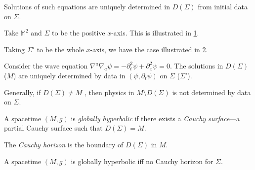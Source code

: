 Solutions of such equations are uniquely determined in $D(\Sigma)$  from initial data on $\Sigma$.
 \begin{example}[]
   Take $\mathbb{M}^2$  and $\Sigma$  to be the positive $x$-axis. This is illustrated in \ref{fig:l6f5}.
   \begin{figure}[tbhp]
     \centering
     \def\svgwidth{0.4\columnwidth}
     
     \caption{}
     \label{fig:l6f5}
   \end{figure}
   \begin{figure}[tbhp]
     \centering
     \def\svgwidth{0.4\columnwidth}
     
     \caption{}
     \label{fig:l6f6}
   \end{figure}
   Taking $\Sigma'$ to be the whole $x$-axis, we have the case illustrated in \ref{fig:l6f6}.

  Consider the wave equation $\nabla^{a} \nabla_{a} \psi = -\partial_t^2 \psi + \partial_x^2 \psi = 0$.
  The solutions in $D(\Sigma)$ ($M$) are uniquely determined by data in $(\psi, \partial_t \psi)$ on $\Sigma$ ($\Sigma'$).
\end{example}

Generally, if $D(\Sigma) \neq M$ , then physics in $M \setminus D(\Sigma)$  is not determined by data on $\Sigma$.

 \begin{definition}[]
   A spacetime $(M, g)$ is \emph{globally hyperbolic} if there exists a \emph{Cauchy surface}---a partial Cauchy surface such that $D(\Sigma) = M$.
\end{definition}
\begin{definition}[]
  The \emph{Cauchy horizon} is the boundary of $D(\Sigma)$ in $M$.
\end{definition}

A spacetime $(M, g)$ is globally hyperbolic iff no Cauchy horizon for $\Sigma$.
